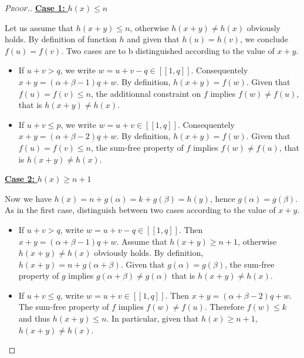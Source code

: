 \begin{proof}[\textsc{Proof.}]
	\noindent \underline{\textbf{Case 1:} \(h(x) \leqslant n\)}
	\par
	Let us assume that \(h(x+y) \leqslant n\), otherwise \(h(x + y) \neq h(x)\) obviously holds. By definition of function 
	\(h\) and given that \(h(u) = h(v)\), we conclude \(f(u) = f(v)\). Two cases are to b distinguished according to the value of \(x + y\).
	
	\begin{itemize}
	\item If \(u + v > q\), we write \(w = u + v - q \in [\![1, q]\!]\). Consequentely \(x + y = (\alpha + \beta - 1) q + w\). By definition, 
		\(h(x + y) = f(w)\). Given that \(f(u) = f(v) \leqslant n\), the additionnal constraint on \(f\) implies \(f(w) 
		\neq f(u)\), that is \(h(x + y) \neq h(x)\).
	\item If \(u + v \leqslant p\), we write \(w = u + v \in [\![1, q]\!]\). Consequentely \(x+y = (\alpha + \beta- 2) q + w\). By definition, 
		\(h(x + y) = f(w)\). Given that \(f(u) = f(v) \leqslant n\), the sum-free property of \(f\) implies \(f(w) \neq f(u)\), 
		that is \(h(x + y) \neq h(x)\).
	\end{itemize} 
	  
	\noindent \underline{\textbf{Case 2:} \(h(x) \geqslant n + 1\)}
	\par
	Now we have \(h(x) = n + g(\alpha) = 
	k + g(\beta) = h(y)\), hence \(g(\alpha) = g(\beta)\). As in the first case, distinguish between two cases according 
	to the value of \(x + y\).
	
	\begin{itemize}
	\item \begin{sloppypar}
		If \(u + v > q\), write \(w = u + v - q \in [\![1, q]\!]\). Then \(x + y = (\alpha + \beta - 1) q + w\). Assume that 
		\({h(x+y) \geqslant n + 1}\),  otherwise \(h(x + y) \neq h(x)\) obviously holds. By definition, \({h(x + y) = n + g(\alpha + 
		\beta)}\). Given that \(g(\alpha) = g(\beta)\), the sum-free property of \(g\) implies \(g(\alpha + \beta) 
		\neq g(\alpha)\) that is \(h(x + y) \neq h(x)\).
		\end{sloppypar}
	\item  If \(u + v \leqslant q\), write \(w = u + v \in [\![1, q]\!]\). Then \(x+y = (\alpha + \beta- 2) q + w\). The sum-free 
		property of \(f\) implies \(f(w) \neq f(u)\). Therefore \(f(w) \leqslant k\) and thus \(h(x + y) \leqslant n\). In particular,
		given that \(h(x) \geqslant n + 1\), \(h(x + y) \neq h(x)\).
	\end{itemize}
\end{proof}

